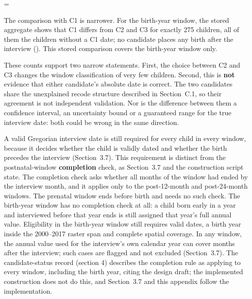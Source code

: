 \begingroup\edef\ThesisSavedIndent{\the\parindent}\raggedright\parindent=\ThesisSavedIndent\relax{}

The comparison with C1 is narrower. For the birth-year window, the stored aggregate shows that C1 differs from C2 and C3 for exactly 275 children, all of them the children without a C1 date; no candidate places any birth after the interview (). This stored comparison covers the birth-year window only.

\par\endgroup

These counts support two narrow statements. First, the choice between C2 and C3 changes the window classification of very few children. Second, this is \textbf{not} evidence that either candidate's absolute date is correct. The two candidates share the unexplained recode structure described in Section~C.1, so their agreement is not independent validation. Nor is the difference between them a confidence interval, an uncertainty bound or a guaranteed range for the true interview date: both could be wrong in the same direction.

A valid Gregorian interview date is still required for every child in every window, because it decides whether the child is validly dated and whether the birth precedes the interview (Section~3.7). This requirement is distinct from the postnatal-window \textbf{completion} check, as Section~3.7 and the construction script state. The completion check asks whether all months of the window had ended by the interview month, and it applies only to the post-12-month and post-24-month windows. The prenatal window ends before birth and needs no such check. The birth-year window has no completion check at all: a child born early in a year and interviewed before that year ends is still assigned that year's full annual value. Eligibility in the birth-year window still requires valid dates, a birth year inside the 2000--2017 raster span and complete spatial coverage. In any window, the annual value used for the interview's own calendar year can cover months after the interview; such cases are flagged and not excluded (Section~3.7). The candidate-status record (section 4) describes the completion rule as applying to every window, including the birth year, citing the design draft; the implemented construction does not do this, and Section~3.7 and this appendix follow the implementation.

